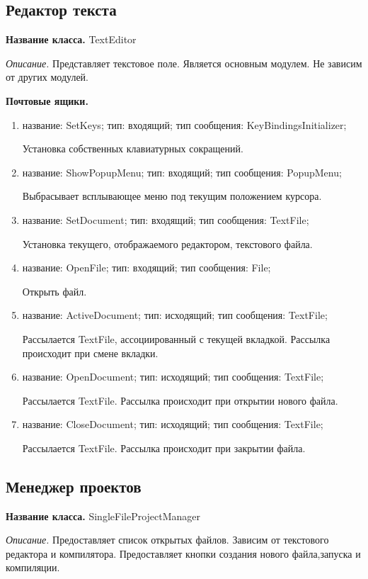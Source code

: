\documentclass[12pt]{article}
\begin{document}
\subsection{Редактор текста}

{\bf Название класса.} TextEditor

\textit{Описание.} Представляет текстовое поле. Является основным модулем. Не зависим от других модулей.

\textbf{Почтовые ящики.} 

\begin{enumerate}

\item название: SetKeys; тип: входящий; тип сообщения: KeyBindingsInitializer;

Установка собственных клавиатурных сокращений.
\item название: ShowPopupMenu; тип: входящий; тип сообщения: PopupMenu;

Выбрасывает всплывающее меню под текущим положением курсора.
\item название: SetDocument; тип: входящий; тип сообщения: TextFile;

Установка текущего, отображаемого редактором, текстового файла.
\item название: OpenFile; тип: входящий; тип сообщения: File;

Открыть файл.
\item название: ActiveDocument; тип: исходящий; тип сообщения: TextFile;

Рассылается TextFile, ассоциированный с текущей вкладкой. Рассылка происходит при смене вкладки.

\item название: OpenDocument; тип: исходящий; тип сообщения: TextFile;

Рассылается TextFile. Рассылка происходит при открытии нового файла.
\item название: CloseDocument; тип: исходящий; тип сообщения: TextFile;

Рассылается TextFile. Рассылка происходит при закрытии файла.

\end{enumerate}

\subsection{Менеджер проектов}

{\bf Название класса.} SingleFileProjectManager

\textit{Описание.} Предоставляет список открытых файлов. Зависим от текстового редактора и компилятора. Предоставляет кнопки создания нового файла,запуска и компиляции.
\end{document}
